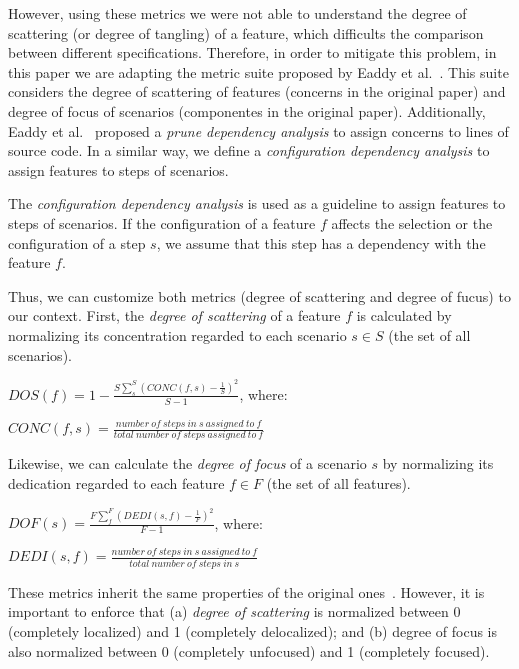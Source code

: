 However, using these metrics we were not able to understand the degree of
scattering (or degree of tangling) of a feature, which difficults the comparison
between different specifications. Therefore, in order to mitigate this problem,
in this paper we are adapting the metric suite proposed by Eaddy et
al.~\cite{Eaddy:2007aa}. This suite considers the degree of scattering of
features (concerns in the original paper) and degree of focus of scenarios
(componentes in the original paper). Additionally, Eaddy et
al.~\cite{Eaddy:2007aa} proposed a \emph{prune dependency analysis} to assign
concerns to lines of source code. In a similar way, we define a
\emph{configuration dependency analysis} to assign features to steps of
scenarios.

\begin{definition}
The \emph{configuration dependency analysis} is used as a guideline to assign
features to steps of scenarios. If the configuration of a feature $f$
affects the selection or the configuration of a step $s$, we assume that this step has a
dependency with the feature $f$.
\end{definition}

Thus, we can customize both metrics (degree of scattering and degree of fucus)
to our context. First, the \emph{degree of scattering} of a feature $f$ is
calculated by normalizing its concentration regarded to each scenario $s \in
S$ (the set of all scenarios).

\begin{center}
$DOS(f) = 1 - \frac{S \sum_{s}^{S}(CONC(f,s)-\frac{1}{S})^2}{S-1}$, where:

$CONC(f,s) = \frac{number\ of\ steps\ in\ s\ assigned\ to\ f}{total\ number\
of\ steps\ assigned\ to\ f}$
\end{center}

Likewise, we can calculate the \emph{degree of focus} of a scenario $s$ by
normalizing its dedication regarded to each feature $f \in F$ (the set of
all features).

\begin{center}
$DOF(s) = \frac{F \sum_{f}^{F}(DEDI(s,f)-\frac{1}{F})^2}{F-1}$, where:

$DEDI(s,f) = \frac{number\ of\ steps\ in\ s\ assigned\ to\ f}{total\ number\
of\ steps\ in\ s}$
\end{center}

These metrics inherit the same properties of the original
ones~\cite{Eaddy:2007aa}. However, it is important to enforce that (a)
\emph{degree of scattering} is normalized between 0 (completely localized) and 1 (completely
delocalized); and (b) degree of focus is also normalized between 0 (completely
unfocused) and 1 (completely focused).

